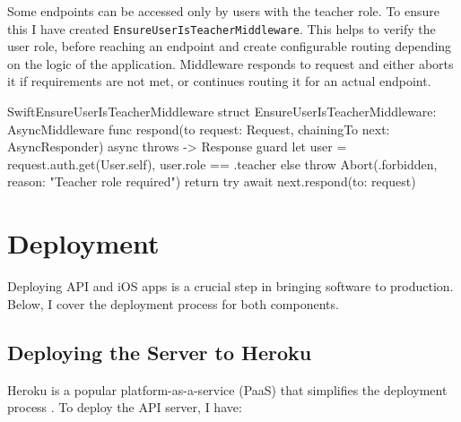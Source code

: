 \documentclass[
  biblatex = false,
  language=english,
  figures=false,
  sourcecodes,
  glossaries,
  index
]{kidiplom}
\begin{document}
Some endpoints can be accessed only by users with the teacher role. To ensure this I have created \texttt{EnsureUserIsTeacherMiddleware}. This helps to verify the user role, before reaching an endpoint and create configurable routing depending on the logic of the application. Middleware responds to request and either aborts it if requirements are not met, or continues routing it for an actual endpoint.

\begin{kicode}{Swift}{}{EnsureUserIsTeacherMiddleware}
struct EnsureUserIsTeacherMiddleware: AsyncMiddleware {
    func respond(to request: Request, chainingTo next: AsyncResponder) async throws -> Response {
        guard let user = request.auth.get(User.self),
              user.role == .teacher else {
            throw Abort(.forbidden, reason: "Teacher role required")
        }
        return try await next.respond(to: request)
    }
}
\end{kicode}

\section{Deployment}

Deploying API and iOS apps is a crucial step in bringing software to production. Below, I cover the deployment process for both components.

\subsection{Deploying the Server to Heroku}

Heroku is a popular platform-as-a-service (PaaS) that simplifies the deployment process \cite{bib9}. To deploy the API server, I have:
\end{document}
